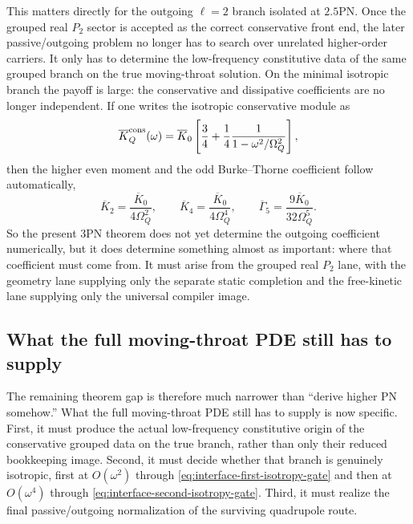 \documentclass[11pt]{article}
\begin{document}
This matters directly for the outgoing $\ell=2$ branch isolated at $2.5$PN.
Once the grouped real $P_2$ sector is accepted as the correct conservative front
end, the later passive/outgoing problem no longer has to search over unrelated
higher-order carriers.  It only has to determine the low-frequency constitutive
data of the same grouped branch on the true moving-throat solution.  On the
minimal isotropic branch the payoff is large: the conservative and dissipative
coefficients are no longer independent.  If one writes the isotropic conservative
module as
\begin{equation}
\overline K_Q^{\rm cons}(\omega)
=
\overline K_0
\left[
\frac34+\frac14\frac{1}{1-\omega^2/\Omega_Q^2}
\right],
\label{eq:interface-single-pole-module}
\end{equation}
then the higher even moment and the odd Burke--Thorne coefficient follow
automatically,
\begin{equation}
\boxed{
\overline K_2=\frac{\overline K_0}{4\Omega_Q^2},
\qquad
\overline K_4=\frac{\overline K_0}{4\Omega_Q^4},
\qquad
\overline\Gamma_5=\frac{9\overline K_0}{32\Omega_Q^5}.
}
\label{eq:interface-single-pole-ledger}
\end{equation}
So the present $3$PN theorem does not yet determine the outgoing coefficient
numerically, but it does determine something almost as important: where that
coefficient must come from.  It must arise from the grouped real $P_2$ lane,
with the geometry lane supplying only the separate static completion and the
free-kinetic lane supplying only the universal compiler image.

\subsection{What the full moving-throat PDE still has to supply}
\label{sec:interface-open}

The remaining theorem gap is therefore much narrower than ``derive higher PN
somehow.''  What the full moving-throat PDE still has to supply is now specific.
First, it must produce the actual low-frequency constitutive origin of the
conservative grouped data on the true branch, rather than only their reduced
bookkeeping image.  Second, it must decide whether that branch is genuinely
isotropic, first at $O(\omega^2)$ through
\eqref{eq:interface-first-isotropy-gate} and then at $O(\omega^4)$ through
\eqref{eq:interface-second-isotropy-gate}.  Third, it must realize the final
passive/outgoing normalization of the surviving quadrupole route.
\end{document}
